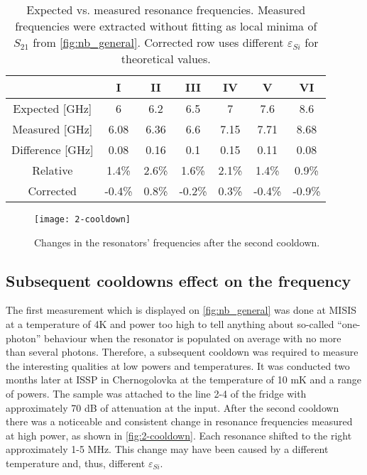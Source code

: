 \documentclass[12pt]{article}
\numberwithin{equation}{section}
\numberwithin{figure}{section}
\begin{document}
\begin{table}
\centering
\bgroup
\def\arraystretch{1.5}%
\begin{tabular}{c|*{6}{c}}
  & I & II & III & IV & V & VI\\
\hline
Expected [GHz]& 6 & 6.2 & 6.5 & 7 & 7.6 & 8.6 \\
Measured [GHz] & 6.08 &  6.36 &  6.6  &  7.15 &  7.71 &  8.68 \\
Difference [GHz]&  0.08 &  0.16 &  0.1  &  0.15 &  0.11 &  0.08 \\
Relative & 1.4\% &  2.6\% &  1.6\% &  2.1\% &  1.4\% &  0.9\% \\
Corrected & -0.4\% &  0.8\% & -0.2\% &  0.3\% & -0.4\% & -0.9\%
\end{tabular}
\egroup
\caption{Expected vs. measured resonance frequencies. Measured frequencies were extracted without fitting as local minima of $S_{21}$ from \autoref{fig:nb_general}. Corrected row uses different $\varepsilon_{Si}$ for theoretical values.}
\label{tab:freqs_nb}
\end{table}

\begin{figure}[h]
\centering
\texttt{[image: 2-cooldown]}
\caption{Changes in the resonators' frequencies after the second cooldown.}
\label{fig:2-cooldown}
\end{figure}

\subsection{Subsequent cooldowns effect on the frequency}

The first measurement which is displayed on \autoref{fig:nb_general} was done at MISIS at a temperature  of 4K and power too high to tell anything about so-called ``one-photon'' behaviour when the resonator is populated on average with no more than several photons. Therefore, a subsequent cooldown was required to measure the interesting qualities at low powers and temperatures. It was conducted two months later at ISSP in Chernogolovka at the temperature of 10 mK and a range of powers. The sample was attached to the line 2-4 of the fridge with approximately 70 dB of attenuation at the input. After the second cooldown there was a noticeable and consistent change in resonance frequencies measured at high power, as shown in \autoref{fig:2-cooldown}. Each resonance shifted to the right approximately 1-5 MHz. This change may have been caused by a different temperature and, thus, different $\varepsilon_{Si}$. \
\end{document}
